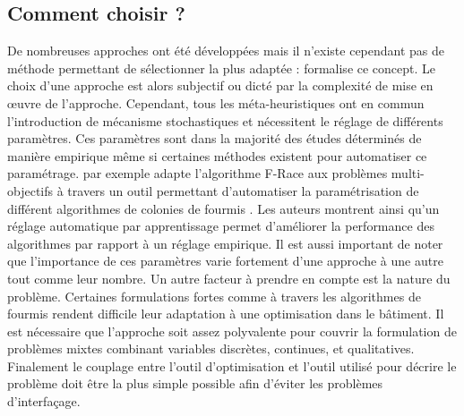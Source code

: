 \subsection{Comment choisir ?} %
\label{sub:comment_choisir}
De nombreuses approches ont été développées mais il n’existe cependant pas de méthode permettant de
sélectionner la plus adaptée : \cite{Wolpert199767} formalise
ce concept. Le choix d’une approche est alors subjectif ou dicté par la complexité de mise en œuvre
de l’approche.
Cependant, tous les méta-heuristiques ont en commun l’introduction de
mécanisme stochastiques et nécessitent le réglage de différents paramètres.
Ces paramètres sont dans la majorité des études déterminés de manière empirique
même si certaines méthodes existent pour automatiser ce paramétrage. \cite{Lopez-Ibanez2012861}
par exemple adapte l’algorithme F-Race \parencite{Birattari2010311} aux problèmes multi-objectifs à travers
un outil permettant d’automatiser la paramétrisation de différent algorithmes de colonies
de fourmis \parencite{Lopez-Ibanez2012861}.
Les auteurs montrent ainsi qu’un réglage automatique par apprentissage permet d’améliorer
la performance des algorithmes par rapport à un réglage empirique.
Il est aussi important de noter que l’importance de ces paramètres varie fortement
d’une approche à une autre tout comme leur nombre.
Un autre facteur à prendre en compte est la nature du problème. Certaines formulations
fortes comme à travers les algorithmes de fourmis rendent difficile leur adaptation
à une optimisation dans le bâtiment. Il est nécessaire que l’approche
soit assez polyvalente pour couvrir la formulation de problèmes mixtes combinant
variables discrètes, continues, et qualitatives.
Finalement le couplage entre l’outil d’optimisation et l’outil utilisé pour décrire
le problème doit être la plus simple possible afin d’éviter les problèmes d’interfaçage.


